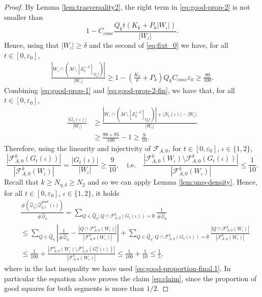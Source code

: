 \documentclass{amsart}
\numberwithin{equation}{section}
\newcommand\ve{\varepsilon}
\renewcommand{\ge}{\geqslant}
\renewcommand{\le}{\leqslant}
\newcommand\cF{{\mathcal F}}
\newcommand\cM{{\mathcal M}}
\newcommand\cQ{{\mathcal Q}}
\newcommand\cS{{\mathcal S}}
\newcommand{\cato}{\cF_{A,0}}
\begin{document}
\begin{proof}
By Lemma \ref{lem:trasversality2}, the right term in \eqref{eq:good-prop-2} is not smaller than
\[
     1- C_{cone} \frac{ Q_k t \left(K_k + P_k|W_\iota|\right)}{|W_\iota|}.
\]
Hence, using that \(|W_\iota| \ge \delta\) and the second of \eqref{eq:fixt_0} we have, for all \(t \in [0,\ve_0]\),
\begin{equation}\label{eq:good-prop-2-fin}
\begin{split}
\frac{\left|W_\iota \cap \left( \cM \setminus  [\cS_0^{+,k} ]_{Q_k t}\right)\right|}{|W_\iota|} \ge 1 - \left(\frac{K_k}{\delta} + P_k \right)Q_k C_{cone} \ve_0 \ge \frac{99}{100}.
\end{split}
\end{equation}
Combining \eqref{eq:good-prop-1} and \eqref{eq:good-prop-2-fin}, we have that, for all \(t \in [0,\ve_0]\),
\[
\begin{split}
  \frac{\left|G_t(\iota)\right|}{|W_\iota|} &\ge \frac{\left|W_\iota \cap \left( \cM \setminus [\cS_0^{+,k} ]_{Q_k t} \right) \right| + \left|N_t (\iota) \right| - |W_\iota|}{|W_\iota|} \\
&\ge \frac{99+95}{100}-1\ge \frac{9}{10}.
\end{split}
\]
Therefore, using the linearity and injectivity of \(\cato\), for \(t \in [0,\ve_0]\), \(\iota \in \{1,2\}\),
\begin{equation}\label{eq:good-proportion-final.1}
  \frac{\left|\cato^k (G_t(\iota))\right|}{|\cato^k (W_\iota)|} = \frac{\left|G_t(\iota)\right|}{|W_\iota|}  \ge \frac{9}{10}, \quad \text{i.e.} \quad  \frac{\left|\cato^k (W_\iota) \setminus \cato^k (G_t(\iota))\right|}{|\cato^k (W_\iota)|} \le \frac{1}{10}.
\end{equation}
Recall that \(k \ge N_{\eta,\delta} \ge N_2\) and so we can apply Lemma \ref{lem:unp-density}. Hence, for all \(t \in [0,\ve_0]\), \(\iota \in \{1,2\}\), it holds
\[
\begin{split}
&\frac{\# \left(\widehat\cQ_{\eta} \setminus  \widehat\cQ_{\eta,t}^{good} (\iota)\right) }{\# \widehat\cQ_{\eta}} = \sum_{Q \in \widehat Q_{\eta}: Q \cap \cato^k \left(G_t(\iota)\right) = \emptyset} \frac{1}{\# \widehat\cQ_{\eta}} \\
&\le  \sum_{Q \in \widehat Q_{\eta}} \left| \frac{1}{\# \widehat\cQ_{\eta}} - \frac{\left|Q \cap \cato^k(W_\iota)\right|}{\left|\cato^k (W_\iota)\right|}\right| +  \sum_{Q \in \widehat Q_{\eta}: Q \cap \cato^k \left(G_t(\iota)\right) = \emptyset} \frac{\left|Q \cap \cato^k(W_\iota)\right|}{\left|\cato^k (W_\iota)\right|} \\
&\le \frac{1}{100} + \frac{\left|\cato^k(W_\iota) \setminus \cato^k \left(G_t^k(\iota)\right)\right|}{\left| \cato^k(W_\iota) \right|} \le \frac{1}{100} + \frac{1}{10} \le \frac{1}{5},
\end{split}
\]
where in the last inequality we have used \eqref{eq:good-proportion-final.1}. In particular the equation above proves the claim \eqref{eq:claim}, since the proportion of good squares for both segments is more than \(1/2\). 


\end{proof}
\end{document}
